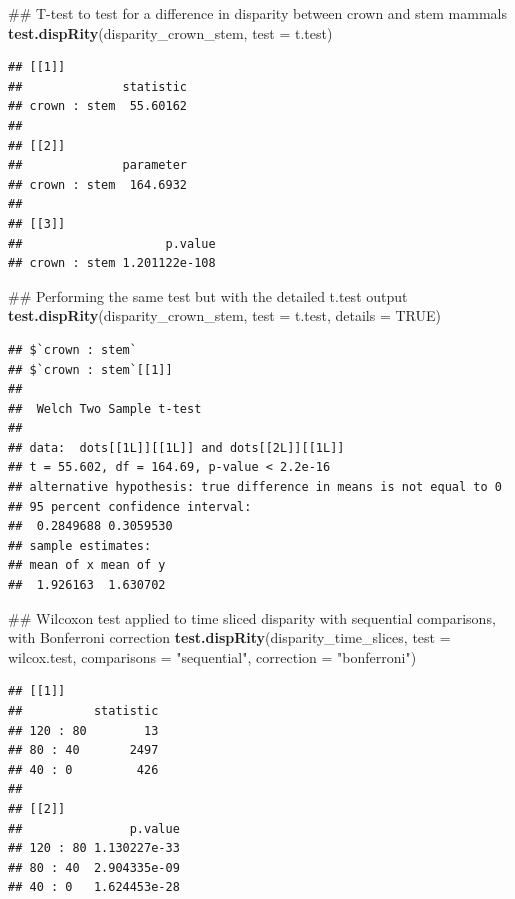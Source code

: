 \documentclass[]{book}
\newenvironment{Shaded}{\begin{snugshade}}{\end{snugshade}}
\newcommand{\KeywordTok}[1]{\textcolor[rgb]{0.13,0.29,0.53}{\textbf{#1}}}
\newcommand{\DataTypeTok}[1]{\textcolor[rgb]{0.13,0.29,0.53}{#1}}
\newcommand{\StringTok}[1]{\textcolor[rgb]{0.31,0.60,0.02}{#1}}
\newcommand{\OtherTok}[1]{\textcolor[rgb]{0.56,0.35,0.01}{#1}}
\newcommand{\NormalTok}[1]{#1}
\theoremstyle{definition}
\theoremstyle{definition}
\theoremstyle{remark}
\begin{document}
\begin{Shaded}
\begin{Highlighting}[]
\NormalTok{## T-test to test for a difference in disparity between crown and stem mammals}
\KeywordTok{test.dispRity}\NormalTok{(disparity_crown_stem, }\DataTypeTok{test =}\NormalTok{ t.test)}
\end{Highlighting}
\end{Shaded}

\begin{verbatim}
## [[1]]
##              statistic
## crown : stem  55.60162
## 
## [[2]]
##              parameter
## crown : stem  164.6932
## 
## [[3]]
##                    p.value
## crown : stem 1.201122e-108
\end{verbatim}

\begin{Shaded}
\begin{Highlighting}[]
\NormalTok{## Performing the same test but with the detailed t.test output}
\KeywordTok{test.dispRity}\NormalTok{(disparity_crown_stem, }\DataTypeTok{test =}\NormalTok{ t.test, }\DataTypeTok{details =} \OtherTok{TRUE}\NormalTok{)}
\end{Highlighting}
\end{Shaded}

\begin{verbatim}
## $`crown : stem`
## $`crown : stem`[[1]]
## 
##  Welch Two Sample t-test
## 
## data:  dots[[1L]][[1L]] and dots[[2L]][[1L]]
## t = 55.602, df = 164.69, p-value < 2.2e-16
## alternative hypothesis: true difference in means is not equal to 0
## 95 percent confidence interval:
##  0.2849688 0.3059530
## sample estimates:
## mean of x mean of y 
##  1.926163  1.630702
\end{verbatim}

\begin{Shaded}
\begin{Highlighting}[]
\NormalTok{## Wilcoxon test applied to time sliced disparity with sequential comparisons, with Bonferroni correction}
\KeywordTok{test.dispRity}\NormalTok{(disparity_time_slices, }\DataTypeTok{test =}\NormalTok{ wilcox.test,}
              \DataTypeTok{comparisons =} \StringTok{"sequential"}\NormalTok{, }\DataTypeTok{correction =} \StringTok{"bonferroni"}\NormalTok{)}
\end{Highlighting}
\end{Shaded}

\begin{verbatim}
## [[1]]
##          statistic
## 120 : 80        13
## 80 : 40       2497
## 40 : 0         426
## 
## [[2]]
##               p.value
## 120 : 80 1.130227e-33
## 80 : 40  2.904335e-09
## 40 : 0   1.624453e-28
\end{verbatim}
\end{document}
